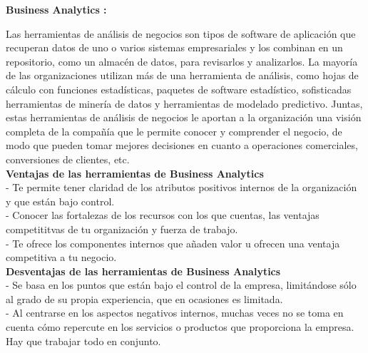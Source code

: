 \documentclass[%
 reprint,
 amsmath,amssymb,
 aps,
]{revtex4-1}
\begin{document}
\textbf {Business Analytics :}

Las herramientas de análisis de negocios son tipos de software de aplicación que recuperan datos de uno o varios sistemas empresariales y los combinan en un repositorio, como un almacén de datos, para revisarlos y analizarlos. La mayoría de las organizaciones utilizan más de una herramienta de análisis, como hojas de cálculo con funciones estadísticas, paquetes de software estadístico, sofisticadas herramientas de minería de datos y herramientas de modelado predictivo.  Juntas, estas herramientas de análisis de negocios le aportan a la organización una visión completa de la compañía que le permite conocer y comprender el negocio, de modo que pueden tomar mejores decisiones en cuanto a operaciones comerciales, conversiones de clientes, etc.
\\
\textbf{ Ventajas de las herramientas de Business Analytics}\\
- Te permite tener claridad de los atributos positivos internos de la organización y que están bajo control.\\
- Conocer las fortalezas de los recursos con los que cuentas, las ventajas competititvas de tu organización y fuerza de trabajo.\\
- Te ofrece los componentes internos que añaden valor u ofrecen una ventaja competitiva a tu negocio.\\
\textbf{ Desventajas de las herramientas de Business Analytics}\\
- Se basa en los puntos que están bajo el control de la empresa, limitándose sólo al grado de su propia experiencia, que en ocasiones es limitada.\\
- Al centrarse en los aspectos negativos internos, muchas veces no se toma en cuenta cómo repercute en los servicios o productos que proporciona la empresa. Hay que trabajar todo en conjunto.\\
\end{document}
